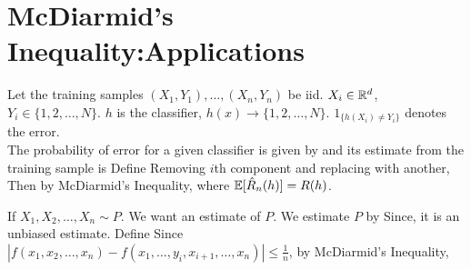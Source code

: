 \documentclass[all-lectures.tex]{subfiles}
\begin{document}

\setcounter{section}{3}
\setcounter{subsection}{1}

\section*{}

\section{McDiarmid's Inequality:Applications} 
\begin{exmp}
Let the training samples $(X_1, Y_1), \dots, (X_n,Y_n)$ be iid. $X_i \in \mathbb{R}^d$, $Y_i \in \{1, 2, \dots, N\}$.
$h$  is the classifier, $h(x) \to \{1, 2, \dots, N\}$. 
$1_{\{h(X_i) \neq Y_i\}}$ denotes the error.\\
The probability of error for a given classifier is given by
and its estimate from the training sample is 
Define
Removing $i$th component and replacing with another,
Then by McDiarmid's Inequality,
where $\mathbb{E}[\hat{R}_n(h)] = R(h)$.
\end{exmp}

\begin{exmp}
If $X_1, X_2, \dots, X_n \sim P$. We want an estimate of $P$.
 We estimate $P$ by 
Since,
it is an unbiased estimate. Define
Since $|f(x_1, x_2, \dots, x_n) - f(x_1, \dots,y_i, x_{i+1}, \dots, x_n)| \le  \frac{1}{n}$,
by  McDiarmid's Inequality,
\end{exmp}
\end{document}
